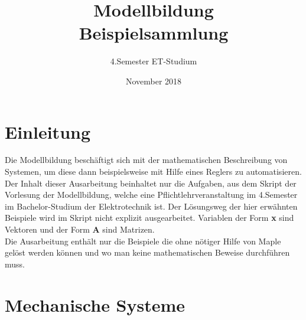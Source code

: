 \documentclass[a4paper,12p]{article}
\title{\huge Modellbildung\\\large \huge Beispielsammlung}
\author{\huge 4.Semester ET-Studium}
\date{\huge November 2018}
\begin{document}
	
\maketitle
\newpage
\tableofcontents
\newpage
\section{Einleitung}
Die Modellbildung beschäftigt sich mit der mathematischen Beschreibung von Systemen, um diese dann beispielsweise mit Hilfe eines Reglers zu automatisieren.
\newline
Der Inhalt dieser Ausarbeitung beinhaltet nur die Aufgaben, aus dem Skript der Vorlesung der Modellbildung, welche eine Pflichtlehrveranstaltung im 4.Semester im Bachelor-Studium der Elektrotechnik ist. Der Lösungsweg der hier erwähnten Beispiele wird im Skript nicht explizit ausgearbeitet. Variablen der Form \textbf{x} sind Vektoren und der Form \textbf{A} sind Matrizen. \\
Die Ausarbeitung enthält nur die Beispiele die ohne nötiger Hilfe von Maple gelöst werden können und wo man keine mathematischen Beweise durchführen muss.
\section{Mechanische Systeme}
\end{document}
